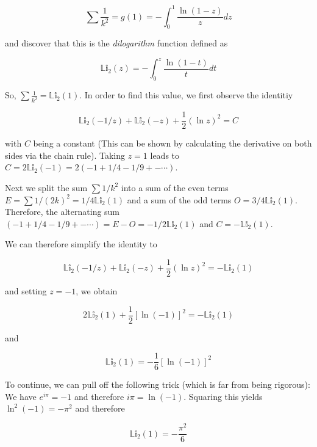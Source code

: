 \[
\sum \frac{1}{k^2} = g(1) = - \int_0^1 \frac{\ln(1-z)}{z} dz
\]

and discover that this is the \emph{dilogarithm} function defined as

\[
\mathbb{Li}_2(z) = - \int_0^z \frac{\ln(1-t)}{t} dt
\]

So, \(\sum \frac{1}{k^2} = \mathbb{Li}_2(1)\). In order to find this
value, we first observe the identitiy

\[
\mathbb{Li}_2(-1/z) + \mathbb{Li}_2(-z) + \frac{1}{2}(\ln z)^2 = C
\]

with \(C\) being a constant (This can be shown by calculating the
derivative on both sides via the chain rule). Taking \(z=1\) leads to
\(C = 2\mathbb{Li}_2(-1) = 2(-1+1/4-1/9 +- \cdots)\).

Next we split the sum \(\sum 1/k^2\) into a sum of the even terms
\(E = \sum 1/(2k)^2 = 1/4 \mathbb{Li}_2(1)\) and a sum of the odd terms
\(O = 3/4 \mathbb{Li}_2(1)\). Therefore, the alternating sum
\((-1+1/4-1/9+- \cdots) = E - O = -1/2 \mathbb{Li}_2(1)\) and
\(C = -\mathbb{Li}_2(1)\).

We can therefore simplify the identity to

\[
\mathbb{Li}_2(-1/z) + \mathbb{Li}_2(-z) + \frac{1}{2}(\ln z)^2 = -\mathbb{Li}_2(1)
\]

and setting \(z=-1\), we obtain

\[
2\mathbb{Li}_2(1) + \frac{1}{2} [\ln(-1)]^2 = -\mathbb{Li}_2(1)
\]

and

\[
\mathbb{Li}_2(1) = - \frac{1}{6} [\ln(-1)]^2
\]

To continue, we can pull off the following trick (which is far from
being rigorous): We have \(e^{i\pi} = -1\) and therefore
\(i\pi = \ln(-1)\). Squaring this yields \(\ln^2(-1) = -\pi^2\) and
therefore

\[
\mathbb{Li}_2(1) = - \frac{\pi^2}{6}
\]
